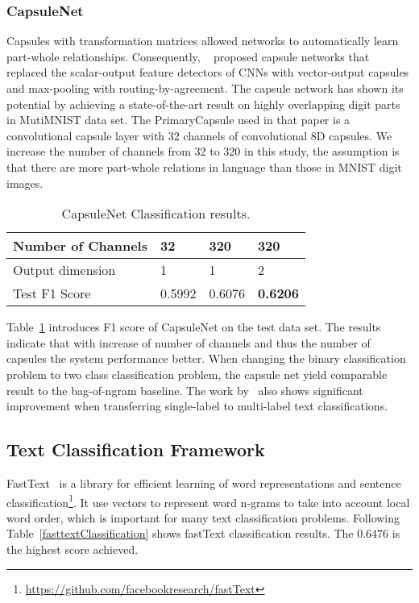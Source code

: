 \documentclass[11pt]{article}
\begin{document}
\subsubsection{CapsuleNet}
Capsules with transformation matrices allowed networks to automatically learn part-whole relationships. Consequently, ~\cite{2017arXiv171009829S} proposed capsule networks that replaced the scalar-output feature detectors of CNNs with vector-output capsules and max-pooling with routing-by-agreement. The capsule network has shown its potential by achieving a state-of-the-art result on highly overlapping digit parts in MutiMNIST data set. The PrimaryCapsule used in that paper is a convolutional capsule layer with 32 channels of convolutional 8D capsules. We increase the number of channels from 32 to 320 in this study, the assumption is that there are more part-whole relations in language than those in MNIST digit images. 


\begin{table}[h]
	\centering
	
	
	\begin{tabular}{|l|l|l|l|}
		\hline
		Number of Channels & 32 & 320 & 320 \\ \hline
		Output dimension   & 1      & 1               & 2      \\ \hline
		Test F1 Score & 0.5992 & 0.6076 & \textbf{0.6206} \\ \hline
	\end{tabular}
	\caption{CapsuleNet Classification results. }
	\label{CapsuleNetTB}
\end{table}


Table~\ref{CapsuleNetTB} introduces F1 score of CapsuleNet on the test data set. The results indicate that with increase of number of channels and thus the number of capsules the system performance better. When changing the binary classification problem to two class classification problem, the capsule net yield comparable result to the bag-of-ngram baseline. The work by~\cite{2018arXiv180400538Z} also shows significant improvement when transferring single-label to multi-label text classifications.




\subsection{Text Classification Framework}
FastText~\cite{joulin2016bag} is a library for efficient learning of word representations and sentence classification\footnote{\url{https://github.com/facebookresearch/fastText}}. It use vectors to represent word n-grams to take into account local word order, which is important for many text classification problems. Following Table~\ref{fasttextClassification} shows fastText classification results. The 0.6476 is the highest score achieved.
\end{document}
